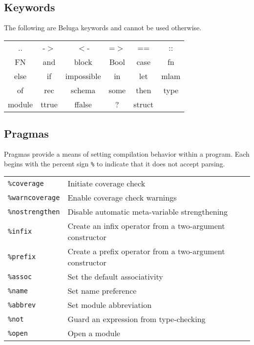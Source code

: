 \documentclass[11pt]{article}
\begin{document}

\subsection{Keywords}
The following are Beluga keywords and cannot be used otherwise. 
\begin{center}
\renewcommand{\arraystretch}{2}
\begin{tabular}{ c c c c c c }
.. & -$>$ & $<$-  & =$>$ &  ==  & :: \\
FN & and & block & Bool & case & fn \\
else & if & impossible & in & let & mlam \\
of & rec & schema & some & then & type \\
module & ttrue & ffalse & ? & struct &  \\
\end{tabular}
\end{center}

\subsection{Pragmas}
Pragmas provide a means of setting compilation behavior within a program. Each begins with the percent sign \texttt{\%} to indicate that it does not accept parsing. \\

\begin{tabular}{ | l l}
\texttt{\%coverage} & Initiate coverage check \\
\texttt{\%warncoverage} & Enable coverage check warnings \\
\texttt{\%nostrengthen} & Disable automatic meta-variable strengthening \\
\texttt{\%infix} & Create an infix operator from a two-argument constructor \\
\texttt{\%prefix} & Create a prefix operator from a two-argument constructor \\
\texttt{\%assoc} & Set the default associativity \\
\texttt{\%name} & Set name preference \\
\texttt{\%abbrev} & Set module abbreviation \\
\texttt{\%not} & Guard an expression from type-checking\\
\texttt{\%open} & Open a module\\
\end{tabular}
\end{document}
